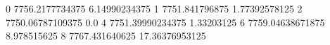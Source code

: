 0 7756.2177734375 6.14990234375
1 7751.841796875 1.77392578125
2 7750.06787109375 0.0
4 7751.39990234375 1.33203125
6 7759.04638671875 8.978515625
8 7767.431640625 17.36376953125
